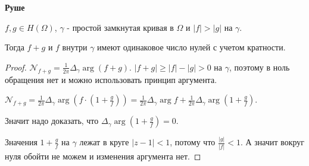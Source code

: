 \begin{theorem}
    \textbf{Руше}

    $f, g \in H(\Omega)$, $\gamma$ - простой замкнутая кривая в $\Omega$ и
    $|f| > |g|$ на $\gamma$.

    Тогда $f + g$ и $f$ внутри $\gamma$ имеют одинаковое число нулей с учетом кратности.
\end{theorem}

\begin{proof}
    $\mathcal{N}_{f + g} = \frac{1}{2 \pi} \Delta_\gamma \arg (f + g)$.
    $|f + g| \geqslant |f| - |g| > 0$ на $\gamma$, поэтому в ноль обращения нет и
    можно использовать принцип аргумента.

    $\mathcal{N}_{f + g} = \frac{1}{2\pi} \Delta_\gamma \arg (f \cdot (1 + \frac{g}{f})) =
    \frac{1}{2\pi} \Delta_\gamma \arg f + \frac{1}{2\pi} \Delta_\gamma \arg (1 + \frac{g}{f})$.

    Значит надо доказать, что $\Delta_\gamma \arg (1 + \frac{g}{f}) = 0$.

    Значения $1 + \frac{g}{f}$ на $\gamma$ лежат в круге $|z - 1| < 1$, потому что $\frac{|g|}{|f|} < 1$. А значит
    вокруг нуля обойти не можем и изменения аргумента нет.
\end{proof}

